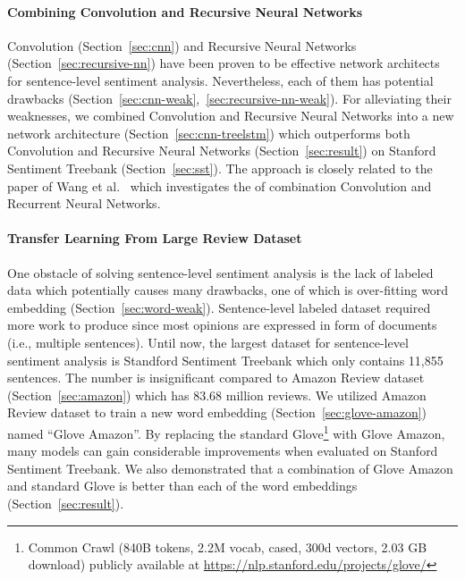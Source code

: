 \paragraph{Combining Convolution and Recursive Neural Networks}Convolution (Section~\ref{sec:cnn}) and Recursive Neural Networks (Section~\ref{sec:recursive-nn}) have been proven to be effective network architects for sentence-level sentiment analysis.
Nevertheless, each of them has potential drawbacks (Section~\ref{sec:cnn-weak},~\ref{sec:recursive-nn-weak}).
For alleviating their weaknesses, we combined Convolution and Recursive Neural Networks into a new network architecture (Section~\ref{sec:cnn-treelstm}) which outperforms both Convolution and Recursive Neural Networks (Section~\ref{sec:result}) on Stanford Sentiment Treebank (Section~\ref{sec:sst}).
The approach is closely related to the paper of Wang et al.~\cite{cnn-rnn} which investigates the of combination Convolution and Recurrent Neural Networks.
\paragraph{Transfer Learning From Large Review Dataset} One obstacle of solving sentence-level sentiment analysis is the lack of labeled data which potentially causes many drawbacks, one of which is over-fitting word embedding (Section~\ref{sec:word-weak}). Sentence-level labeled dataset required more work to produce since most opinions are expressed in form of documents (i.e., multiple sentences).
Until now, the largest dataset for sentence-level sentiment analysis is Standford Sentiment Treebank which only contains 11,855 sentences.
The number is insignificant compared to Amazon Review dataset (Section~\ref{sec:amazon}) which has 83.68 million reviews.
We utilized Amazon Review dataset to train a new word embedding (Section~\ref{sec:glove-amazon}) named ``Glove Amazon''.
By replacing the standard Glove\footnote{Common Crawl (840B tokens, 2.2M vocab, cased, 300d vectors, 2.03 GB download) publicly available at \url{https://nlp.stanford.edu/projects/glove/}} with Glove Amazon, many models can gain considerable improvements when evaluated on Stanford Sentiment Treebank.
We also demonstrated that a combination of Glove Amazon and standard Glove is better than each of the word embeddings (Section~\ref{sec:result}).
